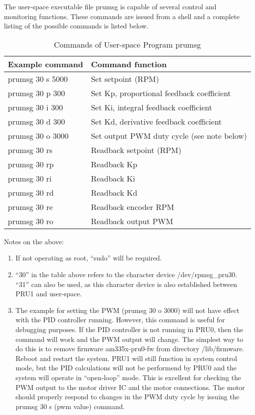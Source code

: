The user-space executable file prumsg is capable of several control and monitoring functions.  These commands are issued from a shell and a complete listing of the possible commands is listed below.

\begin{longtable}{ll}
\caption{Commands of User-space Program prumsg}\\
\toprule
Example command & Command function \\\midrule
prumsg 30 s 5000 & Set setpoint (RPM) \\ 
prumsg 30 p 300 & Set Kp, proportional feedback coefficient \\ 
prumsg 30 i 300 & Set Ki, integral feedback coefficient \\ 
prumsg 30 d 300 & Set Kd, derivative feedback coefficient \\ 
prumsg 30 o 3000 & Set output PWM duty cycle (see note below) \\ 
prumsg 30 rs & Readback setpoint (RPM) \\ 
prumsg 30 rp & Readback Kp \\ 
prumsg 30 ri & Readback Ki \\ 
prumsg 30 rd & Readback Kd \\ 
prumsg 30 re & Readback encoder RPM \\
prumsg 30 ro & Readback output PWM
\end{longtable}

Notes on the above:
\begin{enumerate}
\item If not operating as root, ``sudo'' will be required.
 
\item ``30'' in the table above refers to the character device /dev/rpmsg\_pru30.  ``31'' can also be used, as this character device is also established between PRU1 and user-space.
 
\item The example for setting the PWM (prumsg 30 o 3000) will not have effect with the PID controller running.  However, this command is useful for debugging purposes.  If the PID controller is not running in PRU0, then the command will work and the PWM output will change.  The simplest way to do this is to remove firmware am335x-pru0-fw from directory /lib/firmware.  Reboot and restart the system.  PRU1 will still function in system control mode, but the PID calculations will not be performend by PRU0 and the system will operate in ``open-loop'' mode.  This is excellent for checking the PWM output to the motor driver IC and the motor connections.  The motor should properly respond to changes in the PWM duty cycle by issuing the prumsg 30 s (pwm value) command.
\end{enumerate}

